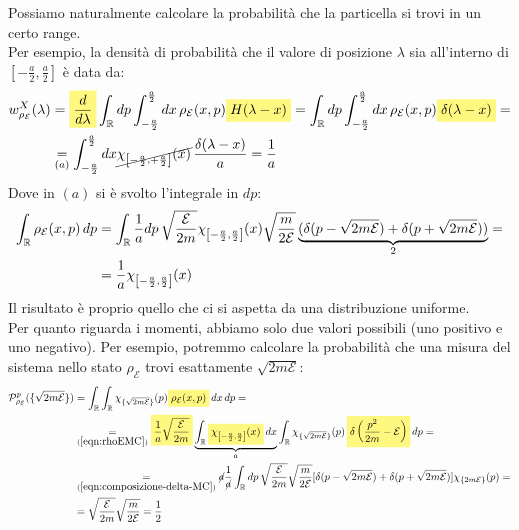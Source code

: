 \documentclass[../../FisicaTeorica.tex]{subfiles}
\begin{document}
Possiamo naturalmente calcolare la probabilità che la particella si trovi in un certo range.\\
Per esempio, la densità di probabilità che il valore di posizione $\lambda$ sia all'interno di $\left[-\frac{a}{2},\frac{a}{2}\right]$ è data da:
\begin{align*}
w^X_{\rho_\mathcal{E}}(\lambda) &= 
\hlc{Yellow}{\frac{d}{d\lambda}}\int_{\bb{R}}dp \int_{-\frac{a}{2}}^{\frac{a}{2}} dx\,\rho_\mathcal{E}(x,p)\hlc{Yellow}{ H(\lambda-x)}
= \int_{\bb{R}}dp \int_{-\frac{a}{2}}^{\frac{a}{2}}dx\, \rho_\mathcal{E}(x,p)\hlc{Yellow}{\delta(\lambda-x)}=\\
&\underset{(a)}{=}\int_{-\frac{a}{2}}^{\frac{a}{2}} dx\cancel{ \chi_{\left[-\frac{a}{2},+\frac{a}{2}\right]}(x)}\,\frac{\delta(\lambda-x)}{a} = \frac{1}{a}
\end{align*}
Dove in $(a)$ si è svolto l'integrale in $dp$:
\begin{align*}
\int_{\mathbb{R}}\rho_\mathcal{E}(x,p)\,dp&=\int_{\mathbb{R}}\frac{1}{a}dp\,\sqrt{\frac{\mathcal{E}}{2m}}\chi_{\left[-\frac{a}{2},\frac{a}{2}\right]}(x)\sqrt{\frac{m}{2\mathcal{E}}}\underbrace{(\delta(p-\sqrt{2m\mathcal{E}})+\delta(p+\sqrt{2m\mathcal{E}}))}_{2} =\\
&= \frac{1}{a}\chi_{\left[-\frac{a}{2}, \frac{a}{2}\right]}(x)
\end{align*}
Il risultato è proprio quello che ci si aspetta da una distribuzione uniforme.\\
Per quanto riguarda i momenti, abbiamo solo due valori possibili (uno positivo e uno negativo). Per esempio, potremmo calcolare la probabilità che una misura del sistema nello stato  $\rho_{\mathcal{E}}$ trovi esattamente $\sqrt{2m\mathcal{E}}$:
\begin{align*}
\mathcal{P}^p_{\rho_\mathcal{E}}(\{\sqrt{2m\mathcal{E}}\})&=\int_\bb{R} \int_\bb{R} \chi_{\{\sqrt{2m\mathcal{E}}\}}(p) \hlc{Yellow}{\rho_\mathcal{E}(x,p)}\,dx\,dp = \\
& \underset{(\ref{eqn:rhoEMC})}{=}
\hlc{Yellow}{\frac{1}{a}\sqrt{\frac{\mathcal{E}}{2m}}}
\underbrace{\int_\bb{R} 
\hlc{Yellow}{\chi_{\left[-\frac{a}{2},\frac{a}{2}\right]}(x)}\,dx}_{a}
\int_\bb{R} \chi_{\{\sqrt{2m\mathcal{E}}\}}(p)\, \hlc{Yellow}{\delta\left(\frac{p^2}{2m}-\mathcal{E}\right)}\,dp = \\
&\underset{(\ref{eqn:composizione-delta-MC})}{=} \cancel{a} \frac{1}{\cancel{a}}\int_\bb{R} dp\,\sqrt{\frac{\mathcal{E}}{2m}} \sqrt{\frac{m}{2\mathcal{E}}}[
\delta(p-\sqrt{2m\mathcal{E}})+\delta(p+\sqrt{2m\mathcal{E}})]\chi_{\{2m\mathcal{E}\}}(p) =\\
&= \sqrt{\frac{\mathcal{E}}{2m}}\sqrt{\frac{m}{2\mathcal{E}}} = \frac{1}{2}
\end{align*}
\end{document}
